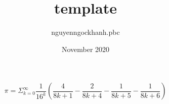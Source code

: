 \documentclass{article}
\title{template}
\author{nguyenngockhanh.pbc }
\date{November 2020}
\begin{document}
\begin{equation}
\pi = \Sigma_{k=0}^{\infty} \frac{1}{16^k} (\frac{4}{8k+1} - \frac{2}{8k+4} - \frac{1}{8k+5} - \frac{1}{8k+6})    
\end{equation}
\end{document}
